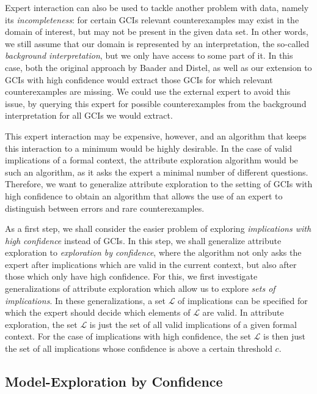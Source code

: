 Expert interaction can also be used to tackle another problem with data, namely its
\emph{incompleteness}: for certain GCIs relevant counterexamples may exist in the domain
of interest, but may not be present in the given data set.  In other words, we still
assume that our domain is represented by an interpretation, the so-called \emph{background
  interpretation}, but we only have access to some part of it.  In this case, both the
original approach by Baader and Distel, as well as our extension to GCIs with high
confidence would extract those GCIs for which relevant counterexamples are missing.  We
could use the external expert to avoid this issue, by querying this expert for possible
counterexamples from the background interpretation for all GCIs we would extract.

This expert interaction may be expensive, however, and an algorithm that keeps this
interaction to a minimum would be highly desirable.  In the case of valid implications of
a formal context, the attribute exploration algorithm would be such an algorithm, as it
asks the expert a minimal number of different questions.  Therefore, we want to generalize
attribute exploration to the setting of GCIs with high confidence to obtain an algorithm
that allows the use of an expert to distinguish between errors and rare counterexamples.

As a first step, we shall consider the easier problem of exploring \emph{implications with
  high confidence} instead of GCIs.  In this step, we shall generalize attribute
exploration to \emph{exploration by confidence}, where the algorithm not only asks the
expert after implications which are valid in the current context, but also after those
which only have high confidence.  For this, we first investigate generalizations of
attribute exploration which allow us to explore \emph{sets of implications}.  In these
generalizations, a set $\mathcal{L}$ of implications can be specified for which the expert
should decide which elements of $\mathcal{L}$ are valid.  In attribute exploration, the
set $\mathcal{L}$ is just the set of all valid implications of a given formal context.
For the case of implications with high confidence, the set $\mathcal{L}$ is then just the
set of all implications whose confidence is above a certain threshold $c$.

\subsection{Model-Exploration by Confidence}
\label{sec:model-expl-conf}

